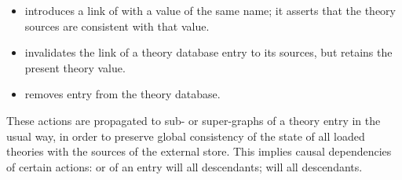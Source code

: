 \begin{isabellebody}
\begin{isamarkuptext}
  \begin{itemize}

  \item {} introduces a link of  with a
   value of the same name; it asserts that the theory
  sources are consistent with that value.

  \item {} invalidates the link of a theory database
  entry to its sources, but retains the present theory value.

  \item {} removes entry  from the theory
  database.
  
  \end{itemize}

  These actions are propagated to sub- or super-graphs of a theory
  entry in the usual way, in order to preserve global consistency of
  the state of all loaded theories with the sources of the external
  store.  This implies causal dependencies of certain actions:  or  of an entry will 
  all descendants;  will  all
  descendants.


\end{isamarkuptext}
\end{isabellebody}
